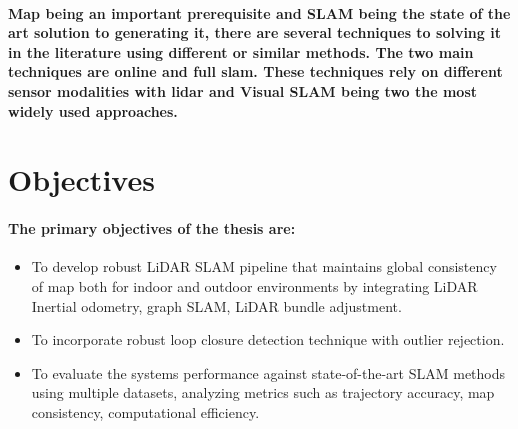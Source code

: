 \paragraph{\textnormal{Map being an important prerequisite and SLAM being the state of the art solution to generating it, there are several techniques to solving it in the literature using different or similar methods. The two main techniques are online and full \gls{slam}. These techniques rely on different sensor modalities with \gls{lidar} and Visual SLAM being two the most widely used approaches.}} 



%


\section{Objectives}
\paragraph{\textnormal{The primary objectives of the thesis are: }}
\begin{itemize}
	\item To develop robust LiDAR SLAM pipeline that maintains global consistency of map both for indoor and outdoor environments by integrating LiDAR Inertial odometry, graph SLAM, LiDAR bundle adjustment.
	\item To incorporate robust loop closure detection technique with outlier rejection.
	\item To evaluate the systems performance against state-of-the-art SLAM methods using multiple datasets, analyzing metrics such as trajectory accuracy, map consistency, computational efficiency.
\end{itemize} 
